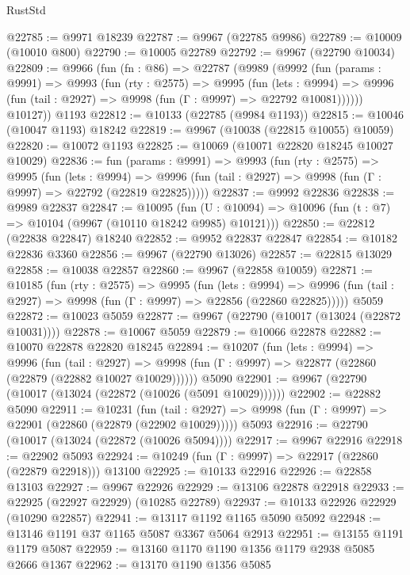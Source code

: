 \begin{lexlean}{RustStd}
\begin{coremodule}
{\begin{coremodule}
{{{{{{{{{{{{{{{{{{{{{{{{{{{{{{{{{{{{{{{{{{{{{{{{{{{{{{{{{{{{{{{{{{{{{{{{{{{{{{@22785 := @9971 @18239
@22787 := @9967 (@22785 @9986)
@22789 := @10009 (@10010 @800)
@22790 := @10005 @22789
@22792 := @9967 (@22790 @10034)
@22809 := @9966
    (fun (fn : @86) =>
    @22787
      (@9989
        (@9992
          (fun (params : @9991) =>
          @9993
            (fun (rty : @2575) =>
            @9995
              (fun (lets : @9994) =>
              @9996 (fun (tail : @2927) => @9998 (fun (Γ : @9997) => @22792 @10081))))))
        @10127))
    @1193
@22812 := @10133 (@22785 (@9984 @1193))
@22815 := @10046 (@10047 @1193) @18242
@22819 := @9967 (@10038 (@22815 @10055) @10059)
@22820 := @10072 @1193
@22825 := @10069 (@10071 @22820 @18245 @10027 @10029)
@22836 := fun (params : @9991) =>
  @9993
    (fun (rty : @2575) =>
    @9995
      (fun (lets : @9994) =>
      @9996 (fun (tail : @2927) => @9998 (fun (Γ : @9997) => @22792 (@22819 @22825)))))
@22837 := @9992 @22836
@22838 := @9989 @22837
@22847 := @10095
    (fun (U : @10094) => @10096 (fun (t : @7) => @10104 (@9967 (@10110 @18242 @9985) @10121)))
@22850 := @22812 (@22838 @22847) @18240
@22852 := @9952 @22837 @22847
@22854 := @10182 @22836 @3360
@22856 := @9967 (@22790 @13026)
@22857 := @22815 @13029
@22858 := @10038 @22857
@22860 := @9967 (@22858 @10059)
@22871 := @10185
    (fun (rty : @2575) =>
    @9995
      (fun (lets : @9994) =>
      @9996 (fun (tail : @2927) => @9998 (fun (Γ : @9997) => @22856 (@22860 @22825)))))
    @5059
@22872 := @10023 @5059
@22877 := @9967 (@22790 (@10017 (@13024 (@22872 @10031))))
@22878 := @10067 @5059
@22879 := @10066 @22878
@22882 := @10070 @22878 @22820 @18245
@22894 := @10207
    (fun (lets : @9994) =>
    @9996
      (fun (tail : @2927) =>
      @9998 (fun (Γ : @9997) => @22877 (@22860 (@22879 (@22882 @10027 @10029))))))
    @5090
@22901 := @9967 (@22790 (@10017 (@13024 (@22872 (@10026 (@5091 @10029))))))
@22902 := @22882 @5090
@22911 := @10231
    (fun (tail : @2927) => @9998 (fun (Γ : @9997) => @22901 (@22860 (@22879 (@22902 @10029)))))
    @5093
@22916 := @22790 (@10017 (@13024 (@22872 (@10026 @5094))))
@22917 := @9967 @22916
@22918 := @22902 @5093
@22924 := @10249 (fun (Γ : @9997) => @22917 (@22860 (@22879 @22918))) @13100
@22925 := @10133 @22916
@22926 := @22858 @13103
@22927 := @9967 @22926
@22929 := @13106 @22878 @22918
@22933 := @22925 (@22927 @22929) (@10285 @22789)
@22937 := @10133 @22926 @22929 (@10290 @22857)
@22941 := @13117 @1192 @1165 @5090 @5092
@22948 := @13146 @1191 @37 @1165 @5087 @3367 @5064 @2913
@22951 := @13155 @1191 @1179 @5087
@22959 := @13160 @1170 @1190 @1356 @1179 @2938 @5085 @2666 @1367
@22962 := @13170 @1190 @1356 @5085
}}}}}}}}}}}}}}}}}}}}}}}}}}}}}}}}}}}}}}}}}}}}}}}}}}}}}}}}}}}}}}}}}}}}}}}}}}}}}}
\end{coremodule}}
\end{coremodule}
\end{lexlean}
